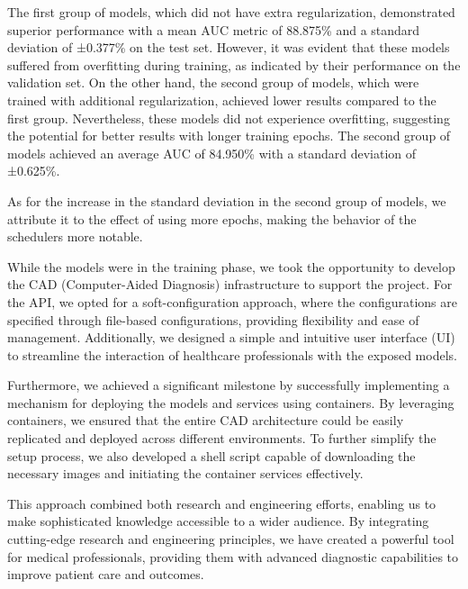 The first group of models, which did not have extra regularization,
demonstrated superior performance with a mean AUC metric of 88.875\% and a
standard deviation of ±0.377\% on the test set. However, it was evident that
these models suffered from overfitting during training, as indicated by their
performance on the validation set. On the other hand, the second group of
models, which were trained with additional regularization, achieved lower
results compared to the first group. Nevertheless, these models did not
experience overfitting, suggesting the potential for better results with longer
training epochs. The second group of models achieved an average AUC of 84.950\%
with a standard deviation of ±0.625\%. \newline

As for the increase in the standard deviation in the second group of models, we
attribute it to the effect of using more epochs, making the behavior of the
schedulers more notable. \newline

While the models were in the training phase, we took the opportunity to develop
the CAD (Computer-Aided Diagnosis) infrastructure to support the project. For
the API, we opted for a soft-configuration approach, where the configurations
are specified through file-based configurations, providing flexibility and ease
of management. Additionally, we designed a simple and intuitive user interface
(UI) to streamline the interaction of healthcare professionals with the exposed
models. \newline

Furthermore, we achieved a significant milestone by successfully implementing a
mechanism for deploying the models and services using containers. By leveraging
containers, we ensured that the entire CAD architecture could be easily
replicated and deployed across different environments. To further simplify the
setup process, we also developed a shell script capable of downloading the
necessary images and initiating the container services effectively. \newline

This approach combined both research and engineering efforts, enabling us to
make sophisticated knowledge accessible to a wider audience. By integrating
cutting-edge research and engineering principles, we have created a powerful
tool for medical professionals, providing them with advanced diagnostic
capabilities to improve patient care and outcomes. \newline

